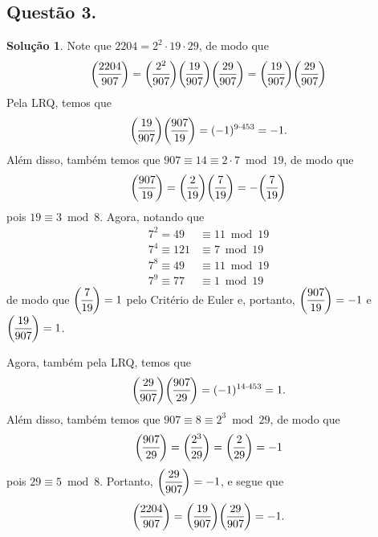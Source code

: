 \documentclass[a4paper,12pt]{article}
\newcommand{\genlegendre}[4]{%
	\genfrac{(}{)}{}{#1}{#3}{#4}%
	\if\relax\detokenize{#2}\relax\else_{\!#2}\fi
}
\newcommand{\legendre}[3][]{\genlegendre{}{#1}{#2}{#3}}
\theoremstyle{definition}
\newtheorem*{solution}{Solução}
\begin{document}
	\subsection*{Questão 3.}
	\begin{solution}
		Note que $2204 = 2^2\cdot 19\cdot 29$, de modo que
		\begin{align*}
		\legendre[]{2204}{907} = \legendre[]{2^2}{907}\legendre[]{19}{907}\legendre[]{29}{907} = \legendre[]{19}{907}\legendre[]{29}{907}
		\end{align*}
		Pela LRQ, temos que
		\begin{align*}
		\legendre[]{19}{907}\legendre[]{907}{19} = (-1)^{9\cdot 453} = -1.
		\end{align*}
		Além disso, também temos que $907\equiv 14\equiv 2\cdot 7\bmod 19$, de modo que
		\begin{align*}
		\legendre[]{907}{19} = \legendre[]{2}{19}\legendre[]{7}{19} = -\legendre[]{7}{19}
		\end{align*}
		pois $19\equiv 3\bmod 8$. Agora, notando que
		\begin{align*}
		7^2 = 49 &\equiv 11 \bmod 19 \\
		7^4 \equiv 121 &\equiv 7 \bmod 19 \\
		7^8 \equiv 49 &\equiv 11 \bmod 19 \\
		7^9 \equiv 77 &\equiv 1 \bmod 19  
		\end{align*}
		de modo que $\displaystyle{ \legendre[]{7}{19} = 1 }$ pelo Critério de Euler e, portanto, $\displaystyle{ \legendre[]{907}{19} = -1 }$ e $\displaystyle{ \legendre[]{19}{907} = 1 }$.
		\par Agora, também pela LRQ, temos que
		\begin{align*}
		\legendre[]{29}{907}\legendre[]{907}{29} = (-1)^{14\cdot 453} = 1.
		\end{align*}
		Além disso, também temos que $907 \equiv 8 \equiv 2^3\bmod 29$, de modo que
		\begin{align*}
		\legendre[]{907}{29} = \legendre[]{2^3}{29} = \legendre[]{2}{29} = -1
		\end{align*}
		pois $29\equiv 5\bmod 8$. Portanto, $\displaystyle{ \legendre[]{29}{907} = -1 }$, e segue que
		\begin{align*}
		\legendre[]{2204}{907} = \legendre[]{19}{907}\legendre[]{29}{907} = -1.
		\end{align*}
	\end{solution}
	
	
	
\end{document}

